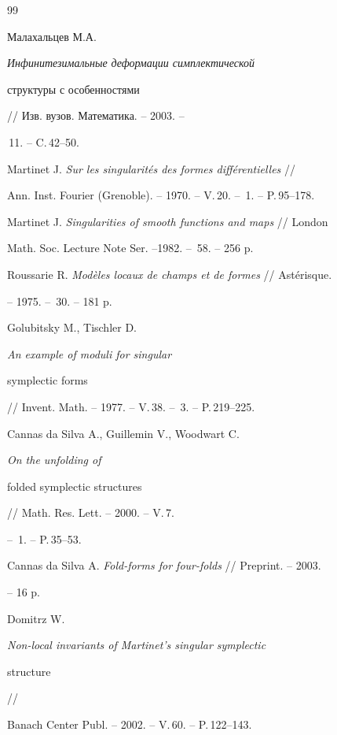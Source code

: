 \begin{thebibliography}{99}







Малахальцев М.А. {\em Инфинитезимальные деформации симплектической


структуры с особенностями} // Изв. вузов. Математика. -- 2003. --


\No\,11. -- C.\,42--50.




Martinet J. {\em Sur les singularit\'es des formes diff\'erentielles} //


Ann. Inst. Fourier (Grenoble). -- 1970. -- V.\,20. -- \No\,1. -- P.\,95--178.




Martinet J. {\em Singularities of smooth functions and maps} // London


Math. Soc. Lecture Note Ser. --1982. -- \No\,58. -- 256 p.




Roussarie R. {\em Mod\`eles locaux de champs et de formes} // Ast\'erisque.


-- 1975. -- \No\,30. -- 181 p.




Golubitsky M., Tischler D. {\em An example of moduli for singular


symplectic forms} // Invent. Math. -- 1977. -- V.\,38. -- \No\,3. -- P.\,219--225.




Cannas da Silva A., Guillemin V., Woodwart C. {\em On the unfolding of


folded symplectic structures} // Math. Res. Lett. -- 2000. -- V.\,7.


-- \No\,1. -- P.\,35--53.




Cannas da Silva A. {\em Fold-forms for four-folds} // Preprint. -- 2003.


-- 16 p.




Domitrz W. {\em Non-local invariants of Martinet's singular symplectic


structure} //


Banach Center Publ. -- 2002. -- V.\,60. -- P.\,122--143.





\end{thebibliography}
